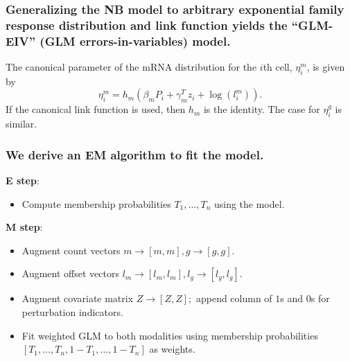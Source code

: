 \documentclass{beamer}
\begin{document}
\begin{frame}
\frametitle{Generalizing the NB model to arbitrary exponential family response distribution and link function yields the ``GLM-EIV'' (GLM errors-in-variables) model.}

The canonical parameter of the mRNA distribution for the $i$th cell, $\eta^m_i$, is given by $$\eta_i^m = h_m\left( \beta_m P_i + \gamma^T_m z_i + \log\left( l_i^m \right) \right).$$ If the canonical link function is used, then $h_m$ is the identity. The case for $\eta_i^g$ is similar.
\end{frame}

\begin{frame}
\frametitle{We derive an EM algorithm to fit the model.}

\textbf{E step}:
\begin{itemize}
\item Compute membership probabilities $T_1, \dots, T_n$ using the model.
\end{itemize}

\textbf{M step}:
\begin{itemize}
\item Augment count vectors $m \rightarrow [m, m], g \rightarrow [g, g]$.
\item Augment offset vectors $l_m \rightarrow [l_m, l_m], l_g \rightarrow [l_g, l_g]$.
\item Augment covariate matrix  $Z \rightarrow [Z, Z];$ append column of $1$s and $0$s for perturbation indicators.
\item Fit weighted GLM to both modalities using membership probabilities $[T_1, \dots, T_n, 1 - T_1, \dots, 1 - T_n]$ as weights.
\end{itemize}

\end{frame}
\end{document}
